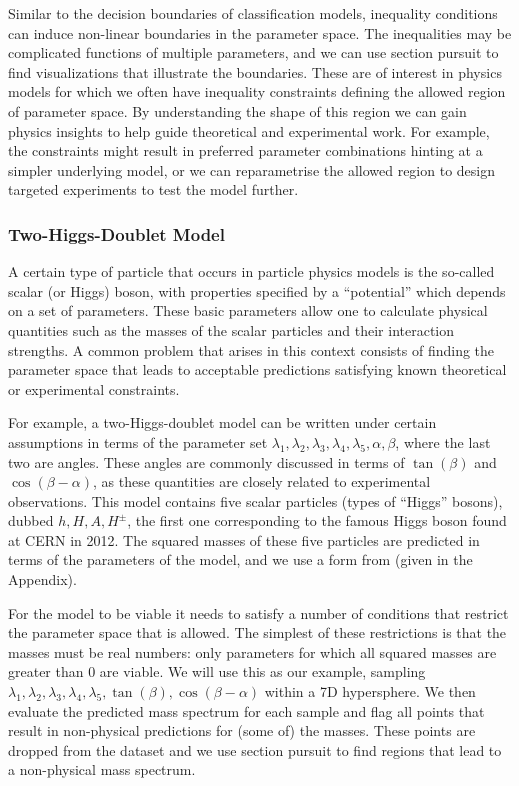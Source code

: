 \documentclass[]{interact}
\theoremstyle{plain}%
\theoremstyle{definition}
\theoremstyle{remark}
\begin{document}
Similar to the decision boundaries of classification models, inequality
conditions can induce non-linear boundaries in the parameter space. The
inequalities may be complicated functions of multiple parameters, and we
can use section pursuit to find visualizations that illustrate the
boundaries. These are of interest in physics models for which we often
have inequality constraints defining the allowed region of parameter
space. By understanding the shape of this region we can gain physics
insights to help guide theoretical and experimental work. For example,
the constraints might result in preferred parameter combinations hinting
at a simpler underlying model, or we can reparametrise the allowed
region to design targeted experiments to test the model further.

\hypertarget{sec:THDM}{%
\subsubsection*{Two-Higgs-Doublet Model}\label{sec:THDM}}

A certain type of particle that occurs in particle physics models is the
so-called scalar (or Higgs) boson, with properties specified by a
``potential'' which depends on a set of parameters. These basic
parameters allow one to calculate physical quantities such as the masses
of the scalar particles and their interaction strengths. A common
problem that arises in this context consists of finding the parameter
space that leads to acceptable predictions satisfying known theoretical
or experimental constraints.

For example, a two-Higgs-doublet model can be written under certain
assumptions in terms of the parameter set
\(\lambda_1,\lambda_2,\lambda_3,\lambda_4,\lambda_5,\alpha,\beta\),
where the last two are angles. These angles are commonly discussed in
terms of \(\tan(\beta)\) and \(\cos(\beta-\alpha)\), as these quantities
are closely related to experimental observations. This model contains
five scalar particles (types of ``Higgs'' bosons), dubbed
\(h,H,A,H^\pm\), the first one corresponding to the famous Higgs boson
found at CERN in 2012. The squared masses of these five particles are
predicted in terms of the parameters of the model, and we use a form
from \citet{Gunion:2002zf} (given in the Appendix).

For the model to be viable it needs to satisfy a number of conditions
that restrict the parameter space that is allowed. The simplest of these
restrictions is that the masses must be real numbers: only parameters
for which all squared masses are greater than 0 are viable. We will use
this as our example, sampling
\(\lambda_1,\lambda_2,\lambda_3,\lambda_4,\lambda_5,\tan(\beta),\cos(\beta-\alpha)\)
within a 7D hypersphere. We then evaluate the predicted mass spectrum
for each sample and flag all points that result in non-physical
predictions for (some of) the masses. These points are dropped from the
dataset and we use section pursuit to find regions that lead to a
non-physical mass spectrum.
\end{document}
